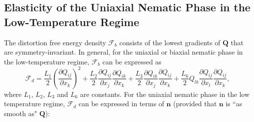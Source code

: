 \documentclass[nottitlepage]{article}
\begin{document}

\subsection {Elasticity of the Uniaxial Nematic Phase in the Low-Temperature Regime}



The distortion free energy density $\mathcal{F}_b$ consists of the lowest gradients of $\mathbf{Q}$ that are symmetry-invariant. In general, for the uniaxial or biaxial nematic phase in the low-temperature regime, $\mathcal{F}_b$ can be expressed as
\begin{equation}\label{eq:F4}
\mathcal{F}_{d}=\frac{L_1}{2}(\frac{\partial Q_{ij}}{\partial x_{k}})^2+\frac{L_2}{2}\frac{\partial Q_{ij}}{\partial x_{j}}\frac{\partial Q_{ik}}{\partial x_{k}}+\frac{L_3}{2}\frac{\partial Q_{ik}}{\partial x_{j}}\frac{\partial Q_{ij}}{\partial x_{k}}+
\frac{L_6}{2}Q_{lk}\frac{\partial Q_{ij}}{\partial x_{l}}\frac{\partial Q_{ij}}{\partial x_{k}},
\end{equation}
where $L_1$, $L_2$, $L_3$ and $L_6$ are constants.
For the uniaxial nematic phase in the low temperature regime, $\mathcal{F}_{d}$ can be expressed in terms of $\mathbf{n}$ (provided that $\mathbf{n}$ is ``as smooth as" $\mathbf{Q}$):
\end{document}
